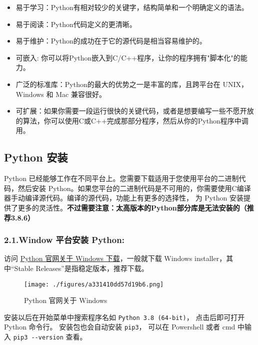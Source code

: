 \begin{itemize}
\item 易于学习：Python有相对较少的关键字，结构简单和一个明确定义的语法。
\item 易于阅读：Python代码定义的更清晰。
\item 易于维护：Python的成功在于它的源代码是相当容易维护的。
\item 可嵌入: 你可以将Python嵌入到C/C++程序，让你的程序拥有"脚本化"的能力。
\item 广泛的标准库：Python的最大的优势之一是丰富的库，且跨平台在 UNIX，Windows 和 Mac 兼容很好。
\item 可扩展：如果你需要一段运行很快的关键代码，或者是想要编写一些不愿开放的算法，你可以使用C或C++完成那部分程序，然后从你的Python程序中调用。
\end{itemize}


\subsection{Python 安装}\label{sub_Python_2}
Python 已经能够工作在不同平台上。您需要下载适用于您使用平台的二进制代码，然后安装 Python。如果您平台的二进制代码是不可用的，你需要使用C编译器手动编译源代码。编译的源代码，功能上有更多的选择性， 为 Python 安装提供了更多的灵活性。\textbf{不过需要注意：太高版本的Python部分库是无法安装的（推荐3.8.6）}

\subsubsection{2.1.Window 平台安装 Python:}
访问 \href{https://www.python.org/downloads/windows/}{Python 官网关于 Windows 下载}，一般就下载  Windows installer，其中“Stable Releases”是指稳定版本，推荐下载。
\begin{figure}[ht]
\centering
\texttt{[image: ./figures/a331410dd57d19b6.png]}
\caption{Python 官网关于 Windows} \label{fig_Python_1}
\end{figure}
安装以后在开始菜单中搜索程序名如 \verb|Python 3.8 (64-bit)|， 点击后即可打开 Python 命令行。 安装包也会自动安装 \verb|pip3|， 可以在 Powershell 或者 cmd 中输入 \verb|pip3 --version| 查看。


